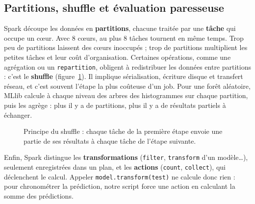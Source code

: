 \documentclass[11pt,a4paper]{article}
\newcommand{\code}[1]{\texttt{#1}}
\begin{document}
\subsection{Partitions, shuffle et évaluation paresseuse}

Spark découpe les données en \textbf{partitions}, chacune traitée par une \textbf{tâche} qui occupe un
cœur. Avec 8 cœurs, au plus 8 tâches tournent en même temps. Trop peu de partitions laissent des
cœurs inoccupés ; trop de partitions multiplient les petites tâches et leur coût d'organisation.
Certaines opérations, comme une agrégation ou un \code{repartition}, obligent à redistribuer les
données entre partitions : c'est le \textbf{shuffle} (figure~\ref{fig:shuffle}). Il implique
sérialisation, écriture disque et transfert réseau, et c'est souvent l'étape la plus coûteuse d'un
job. Pour une forêt aléatoire, MLlib calcule à chaque niveau des arbres des histogrammes sur chaque
partition, puis les agrège : plus il y a de partitions, plus il y a de résultats partiels à échanger.

\begin{figure}[H]
\centering
{}
\caption{Principe du shuffle : chaque tâche de la première étape envoie une partie de ses résultats à
chaque tâche de l'étape suivante.}
\label{fig:shuffle}
\end{figure}

Enfin, Spark distingue les \textbf{transformations} (\code{filter}, \code{transform} d'un modèle\ldots),
seulement enregistrées dans un plan, et les \textbf{actions} (\code{count}, \code{collect}), qui
déclenchent le calcul. Appeler \code{model.transform(test)} ne calcule donc rien : pour chronométrer
la prédiction, notre script force une action en calculant la somme des prédictions.
\end{document}
